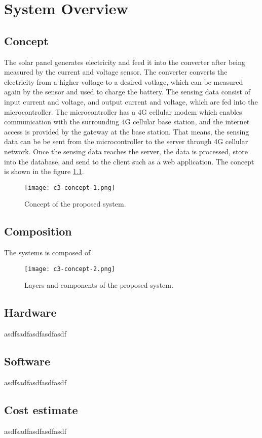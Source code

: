 \documentclass[../thesis.tex]{subfiles}
\begin{document}
\chapter{System Overview}


\section{Concept}

The solar panel generates electricity and feed it into the converter after being measured by the current and voltage sensor. The converter converts the electricity from a higher voltage to a desired votlage, which can be measured again by the sensor and used to charge the battery. The sensing data consist of input current and voltage, and output current and voltage, which are fed into the microcontroller. The microcontroller has a 4G cellular modem which enables communication with the surrounding 4G cellular base station, and the internet access is provided by the gateway at the base station. That means, the sensing data can be be sent from the microcontroller to the server  through 4G cellular network. Once the sensing data reaches the server, the data is processed, store into the database, and send to the client such as a web application. The concept is shown in the figure \ref{fig:concept1}.

\begin{figure}[!ht]
  \texttt{[image: c3-concept-1.png]}
  \caption{Concept of the proposed system.}
  \label{fig:concept1}
\end{figure}


\section{Composition}

The systems is composed of 



\begin{figure}[!ht]
  \texttt{[image: c3-concept-2.png]}
  \caption{Layers and components of the proposed system.}
  \label{fig:concept2}
\end{figure}


\section{Hardware}

asdfsadfasdfasdfasdf

\section{Software}

asdfsadfasdfasdfasdf

\section{Cost estimate}

asdfsadfasdfasdfasdf
\end{document}
